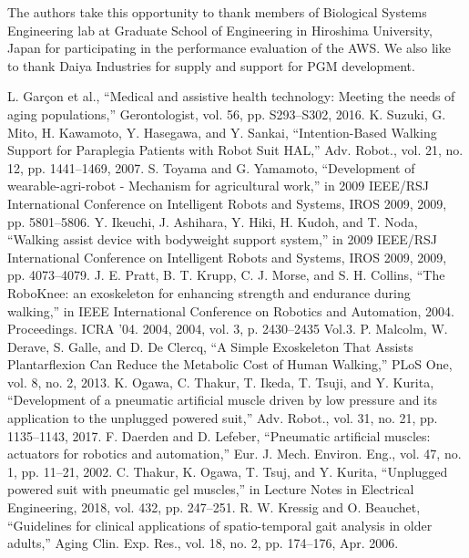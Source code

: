 \documentclass[letterpaper, 10 pt, conference]{ieeeconf}  %
\begin{document}
The authors take this opportunity to thank members of Biological Systems Engineering lab at Graduate School of Engineering in Hiroshima University, Japan for participating in the performance evaluation of the AWS. We also like to thank Daiya Industries for supply and support for PGM development.  

\begin{thebibliography}{10}

	L. Garçon et al., “Medical and assistive health technology: Meeting the needs of aging populations,” Gerontologist, vol. 56, pp. S293–S302, 2016.
	K. Suzuki, G. Mito, H. Kawamoto, Y. Hasegawa, and Y. Sankai, “Intention-Based Walking Support for Paraplegia Patients with Robot Suit HAL,” Adv. Robot., vol. 21, no. 12, pp. 1441–1469, 2007.
	S. Toyama and G. Yamamoto, “Development of wearable-agri-robot - Mechanism for agricultural work,” in 2009 IEEE/RSJ International Conference on Intelligent Robots and Systems, IROS 2009, 2009, pp. 5801–5806.
	Y. Ikeuchi, J. Ashihara, Y. Hiki, H. Kudoh, and T. Noda, “Walking assist device with bodyweight support system,” in 2009 IEEE/RSJ International Conference on Intelligent Robots and Systems, IROS 2009, 2009, pp. 4073–4079.
	J. E. Pratt, B. T. Krupp, C. J. Morse, and S. H. Collins, “The RoboKnee: an exoskeleton for enhancing strength and endurance during walking,” in IEEE International Conference on Robotics and Automation, 2004. Proceedings. ICRA ’04. 2004, 2004, vol. 3, p. 2430–2435 Vol.3.
	P. Malcolm, W. Derave, S. Galle, and D. De Clercq, “A Simple Exoskeleton That Assists Plantarflexion Can Reduce the Metabolic Cost of Human Walking,” PLoS One, vol. 8, no. 2, 2013.
	K. Ogawa, C. Thakur, T. Ikeda, T. Tsuji, and Y. Kurita, “Development of a pneumatic artificial muscle driven by low pressure and its application to the unplugged powered suit,” Adv. Robot., vol. 31, no. 21, pp. 1135–1143, 2017.
	F. Daerden and D. Lefeber, “Pneumatic artificial muscles: actuators for robotics and automation,” Eur. J. Mech. Environ. Eng., vol. 47, no. 1, pp. 11–21, 2002.
	C. Thakur, K. Ogawa, T. Tsuj, and Y. Kurita, “Unplugged powered suit with pneumatic gel muscles,” in Lecture Notes in Electrical Engineering, 2018, vol. 432, pp. 247–251.
R. W. Kressig and O. Beauchet, “Guidelines for clinical applications of spatio-temporal gait analysis in older adults,” Aging Clin. Exp. Res., vol. 18, no. 2, pp. 174–176, Apr. 2006.


\end{thebibliography}
\end{document}
